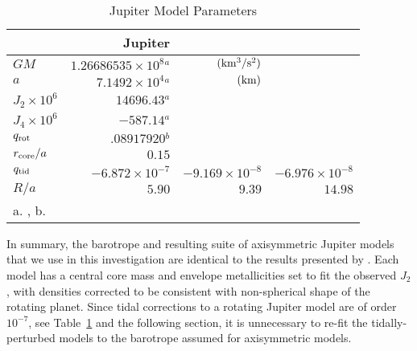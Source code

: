 \begin{table}
\centering

\caption{Jupiter Model Parameters \label{tab:jupiter_params}}
\begin{tabular}{l|rrr}
    \hline
    {} & {Jupiter} & {} & {} \\
    \hline
$GM$ & $1.26686535 \times 10^{8}$$^a$  &  ${\rm (km^3/s^2) }$  & \\
$a$ & $7.1492 \times 10^{4}$$^a$         & ${\rm (km) }$   & \\ 
$J_2  \times  10^6$  & $14696.43$$^a$   &        & \\
$J_4  \times  10^6$  & $-587.14$$^a$  &        & \\
$q_{\rm rot} $  & $ .08917920 $$^b$   & & \\
$r_{\rm core} / a$ & $0.15$  & \\ 
\hline \hline
$q_{\rm tid} $  & $-6.872 \times 10^{-7} $ & $-9.169\times 10^{-8 }$  
&  $-6.976\times10^{-8}$  \\
$R/a$  & $5.90$  &  $9.39$  & $14.98$ \\
\hline
\multicolumn{4}{l}{ a. \citet{jacobson2003}, b. \citet{archinal2011}}
\end{tabular}

\end{table}

In summary, the barotrope and resulting suite of axisymmetric Jupiter models that we
use in this investigation are identical to the results presented by
\citet{hubbard2016}. Each model has a central core mass and envelope metallicities
set to fit the observed $J_2$ \citep{jacobson2003}, with densities corrected to be
consistent with non-spherical shape of the rotating planet. Since tidal corrections
to a rotating Jupiter model are of order $10^{-7}$, see
Table~\ref{tab:jupiter_params} and the following section, it is unnecessary to re-fit
the tidally-perturbed models to the barotrope assumed for axisymmetric models. 

